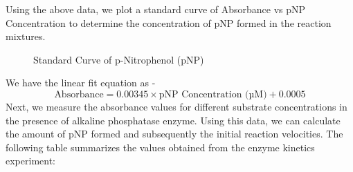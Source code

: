 \documentclass[openany]{book}
\begin{document}
Using the above data, we plot a standard curve of Absorbance vs pNP Concentration to determine the concentration of pNP formed in the reaction mixtures. \\
\begin{figure}[H]
    \centering
    \caption{Standard Curve of p-Nitrophenol (pNP)}
    \label{fig:standard_curve}
\end{figure}
We have the linear fit equation as -
$$\text{Absorbance} = 0.00345 \times \text{pNP Concentration (µM)} + 0.0005$$
Next, we measure the absorbance values for different substrate concentrations in the presence of alkaline phosphatase enzyme. Using this data, we can calculate the amount of pNP formed and subsequently the initial reaction velocities. The following table summarizes the values obtained from the enzyme kinetics experiment:
\end{document}

